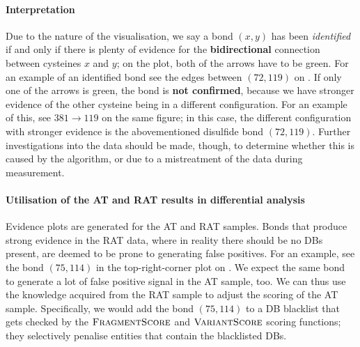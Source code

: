 \paragraph{Interpretation} Due to the nature of the visualisation, we say a bond \((x, y)\) has been \emph{identified} if and only if there is plenty of evidence for the \textbf{bidirectional} connection between cysteines \(x\) and \(y\); on the plot, both of the arrows have to be green. For an example of an identified bond see the edges between \((72, 119)\) on . If only one of the arrows is green, the bond is \textbf{not confirmed}, because we have stronger evidence of the other cysteine being in a different configuration. For an example of this, see \(381 \to 119\) on the same figure; in this case, the different configuration with stronger evidence is the abovementioned disulfide bond \((72, 119)\). Further investigations into the data should be made, though, to determine whether this is caused by the algorithm, or due to a mistreatment of the data during measurement.

\paragraph{Utilisation of the AT and RAT results in differential analysis} Evidence plots are generated for the AT and RAT samples. Bonds that produce strong evidence in the RAT data, where in reality there should be no DBs present, are deemed to be prone to generating false positives. For an example, see the bond \((75, 114)\) in the top-right-corner plot on . We expect the same bond to generate a lot of false positive signal in the AT sample, too. We can thus use the knowledge acquired from the RAT sample to adjust the scoring of the AT sample. Specifically, we would add the bond \((75, 114)\) to a DB blacklist that gets checked by the \(\textsc{FragmentScore}\) and \(\textsc{VariantScore}\) scoring functions; they selectively penalise entities that contain the blacklisted DBs.